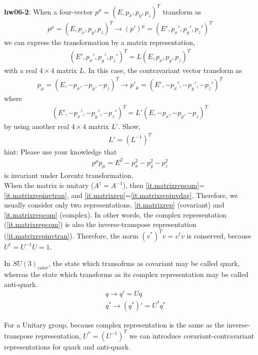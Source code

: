 \documentclass[12pt]{article}
\begin{document}
{\bf hw06-2}:  When a four-vector $p^\mu = (E, p_x, p_y, p_z)^T$ transform as
\begin{eqnarray}
    p^\mu = (E, p_x, p_y, p_z)^T \to (p')^\mu = (E', p_x', p_y', p_z')^T
\end{eqnarray}
   we can express the transformation by a matrix representation,
\begin{eqnarray}
    (E', p_x', p_y', p_z')^T = L (E, p_x, p_y, p_z)^T
\end{eqnarray}
    with a real $4\times 4$ matrix $L$.  In this case, the contravariant
  vector transform as
  \begin{eqnarray}
    p_\mu = (E, -p_x, -p_y, -p_z)^T \to p'_\mu = (E', -p_x', -p_y', -p_z')^T
  \end{eqnarray}
  where
  \begin{eqnarray}
    (E', -p_x', -p_y', -p_z')^T = L' (E, -p_x, -p_y, -p_z)^T
  \end{eqnarray}
   by using another real $4\times 4$ matrix $L'$.  Show,
\begin{eqnarray}
    L' = (L^{-1})^T
\end{eqnarray}
hint: Please use your knowledge that
\begin{eqnarray}
    p^\mu p_\mu = E^2 - p_x^2 - p_y^2 - p_z^2
\end{eqnarray}
  is invariant under Lorentz transformation.\\


  When the matrix is unitary ($A^\dagger = A^{-1}$),
  then \ref{it.matrixrepcom}=\ref{it.matrixrepinvtran}, and \ref{it.matrixrep}=\ref{it.matrixrepinvdag}.  Therefore, we usually consider
  only two representations, \ref{it.matrixrep} (covariant) and \ref{it.matrixrepcom} (complex).
  In other words, the complex representation (\ref{it.matrixrepcom}) is also
  the inverse-transpose representation (\ref{it.matrixrepinvtran}).  Therefore,
  the norm
  $(v^*)^T v = v^\dagger v$
  is conserved, because $U^\dagger = U^{-1} U = 1$.

  In $SU(3)_{color}$, the state which transofrms as covariant
  may be called quark, whereas the state which transforms
  as its complex representation may be called anti-quark.
\begin{eqnarray}
  &&q   \to q'   = U   q \\
  &&q^* \to  (q^*)' = U^* q^*
\end{eqnarray}

  For a Unitary group, because complex representation is the
  same as the inverse-transpose representation,
  $U^* = (U^{-1})^T$
  we can introduce covariant-contravariant representations
  for quark and anti-quark.
\end{document}
